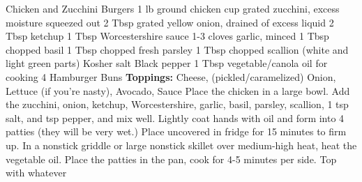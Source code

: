 \documentclass[../cookbook.tex]{subfiles}
\begin{document}
\begin{recipe}{Chicken and Zucchini Burgers}
\ingredients
{1 lb ground chicken}
{ cup grated zucchini, excess moisture squeezed out}
{2 Tbsp grated yellow onion, drained of excess liquid}
{2 Tbsp ketchup}
{1 Tbsp Worcestershire sauce}
{1-3 cloves garlic, minced}
{1 Tbsp chopped basil}
{1 Tbsp chopped fresh parsley}
{1 Tbsp chopped scallion (white and light green parts)}
{Kosher salt}
{Black pepper}
{1 Tbsp vegetable/canola oil for cooking}
{4 Hamburger Buns}
{\textbf{Toppings:} Cheese, (pickled/caramelized) Onion, Lettuce (if you're nasty), Avocado, Sauce}
\stopingredients
\preparation
{Place the chicken in a large bowl. Add the zucchini, onion, ketchup, Worcestershire, garlic, basil, parsley, scallion, 1 tsp salt, and  tsp pepper, and mix well.}
{Lightly coat hands with oil and form into 4 patties (they will be very wet.) Place uncovered in fridge for 15 minutes to firm up.}
{In a nonstick griddle or large nonstick skillet over medium-high heat, heat the vegetable oil. Place the patties in the pan, cook for 4-5 minutes per side.}
{Top with whatever}
\stopprep
\end{recipe}
\end{document}

